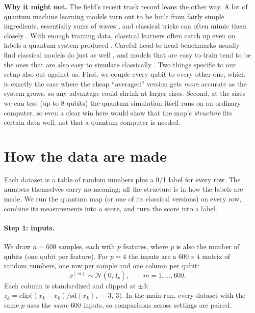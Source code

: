 \documentclass[11pt]{article}
\begin{document}
\textbf{Why it might not.} The field's recent track record leans the other way. A lot of quantum machine
learning models turn out to be built from fairly simple ingredients, essentially sums of waves
\citep{Schuld2021}, and classical tricks can often mimic them closely
\citep{Schreiber2023,Landman2022,Sweke2025}. With enough training data, classical learners often catch up
even on labels a quantum system produced \citep{Huang2021}. Careful head-to-head benchmarks usually find
classical models do just as well \citep{Bowles2024}, and models that are easy to train tend to be the ones
that are also easy to simulate classically \citep{Cerezo2023}. Two things specific to our setup also cut
against us. First, we couple every qubit to every other one, which is exactly the case where the cheap
``averaged'' version gets \emph{more} accurate as the system grows, so any advantage could shrink at larger
sizes. Second, at the sizes we can test (up to 8 qubits) the quantum simulation itself runs on an ordinary
computer, so even a clear win here would show that the map's \emph{structure} fits certain data well, not that
a quantum computer is needed.

\section{How the data are made}

Each dataset is a table of random numbers plus a 0/1 label for every row. The numbers themselves carry no
meaning; all the structure is in how the labels are made. We run the quantum map (or one of its classical
versions) on every row, combine its measurements into a score, and turn the score into a label.

\paragraph{Step 1: inputs.} We draw $n=600$ samples, each with $p$ features, where $p$ is also the number of
qubits (one qubit per feature). For $p=4$ the inputs are a $600\times4$ matrix of random numbers, one row per
sample and one column per qubit:
\begin{equation}
x^{(m)}\sim\mathcal N(0,I_p),\qquad m=1,\dots,600 .
\end{equation}
Each column is standardized and clipped at $\pm3$:
$z_k=\mathrm{clip}\big((x_k-\bar x_k)/\mathrm{sd}(x_k),\,-3,\,3\big)$.
In the main run, every dataset with the same $p$ uses the \emph{same} 600 inputs, so comparisons across
settings are paired.
\end{document}
